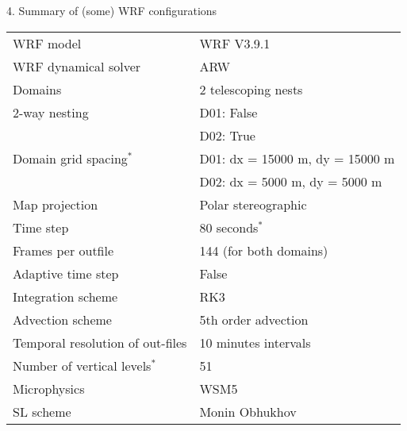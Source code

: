 \documentclass[xcolor=table]{beamer}
\begin{document}
\begin{frame}[fragile, allowframebreaks=.9, t]{4. Summary of (some) WRF configurations}
\begin{longtable}{ p{4.1cm}  |  p{7cm}}
\hline
WRF model                           	& WRF V3.9.1                                                             \\
WRF dynamical solver           	& ARW                                                                         \\
Domains                             		& 2 telescoping nests                                    		  \\
2-way nesting                       	& D01: False                                                              \\
\rowcolor{light-gray}               & D02: True                                                              \\
Domain grid spacing$^*$        & D01: dx = 15000 m, dy = 15000 m                	\\
\rowcolor{white}                    	& D02:  dx = 5000 m, dy = 5000 m                         \\
Map projection                      	& Polar stereographic                                                 \\
Time step                           		& 80 seconds$^*$                                                   \\
Frames per outfile 					 & 144 (for both domains)										\\
Adaptive time step                  & False                                                                      \\
Integration scheme                  & RK3                                                                        \\
Advection scheme                    & 5th order advection                                            \\
Temporal resolution of out-files    & 10 minutes intervals                                     \\
Number of vertical levels$^*$       & 51 \\	%
Microphysics                        	& WSM5                                                                       \\
SL scheme                           	& Monin Obhukhov                                                       \\

\end{longtable}
\end{frame}
\end{document}
